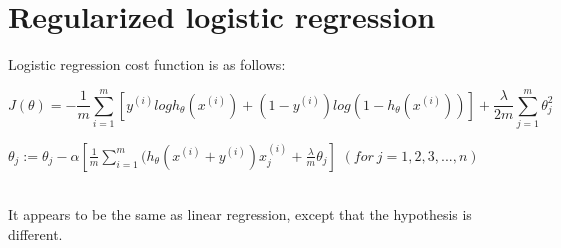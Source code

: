 \documentclass{article}
\begin{document}
\section*{Regularized logistic regression}

Logistic regression cost function is as follows:


$$J(\theta) = -\frac{1}{m} \sum_{i=1}^{m}[ y^{(i)} log h_{\theta}(x^{(i)}) + (1- y^{(i)})log(1 - h_{\theta}(x^{(i)}))] +  \frac{\lambda}{2m} \sum_{j=1}^{m} \theta_j^2$$

\begin{algorithm}
  \caption{Regularized logistic regression}\label{euclid}
  \begin{algorithmic}[1]
    \Large
    \State $\theta_j := \theta_j - \alpha [\frac{1}{m} \sum_{i=1}^{m}(h_{\theta}(x^{(i)} + y^{(i)})x_j^{(i)} + \frac{\lambda}{m} \theta_j]$
    \State $(for\ j = 1, 2, 3, ..., n)$
    \EndWhile
  \end{algorithmic}
\end{algorithm}

~\\
It appears to be the same as linear regression, except that the hypothesis is different.
\end{document}
